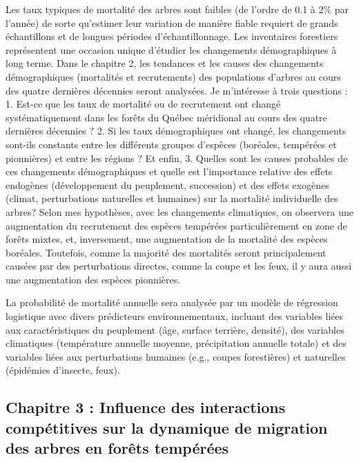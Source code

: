 \documentclass[
]{article}
\begin{document}
Les taux typiques de mortalité des arbres sont faibles (de l'ordre de
0.1 à 2\% par l'année) de sorte qu'estimer leur variation de manière
fiable requiert de grands échantillons et de longues périodes
d'échantillonnage. Les inventaires forestiers représentent une occasion
unique d'étudier les changements démographiques à long terme. Dans le
chapitre 2, les tendances et les causes des changements démographiques
(mortalités et recrutements) des populations d'arbres au cours des
quatre dernières décennies seront analysées. Je m'intéresse à trois
questions : 1. Est-ce que les taux de mortalité ou de recrutement ont
changé systématiquement dans les forêts du Québec méridional au cours
des quatre dernières décennies ? 2. Si les taux démographiques ont
changé, les changements sont-ils constants entre les différents groupes
d'espèces (boréales, tempérées et pionnières) et entre les régions ? Et
enfin, 3. Quelles sont les causes probables de ces changements
démographiques et quelle est l'importance relative des effets endogènes
(développement du peuplement, succession) et des effets exogènes
(climat, perturbations naturelles et humaines) sur la mortalité
individuelle des arbres? Selon mes hypothèses, avec les changements
climatiques, on observera une augmentation du recrutement des espèces
tempérées particulièrement en zone de forêts mixtes, et, inversement,
une augmentation de la mortalité des espèces boréales. Toutefois, comme
la majorité des mortalités seront principalement causées par des
perturbations directes, comme la coupe et les feux, il y aura aussi une
augmentation des espèces pionnières.

La probabilité de mortalité annuelle sera analysée par un modèle de
régression logistique avec divers prédicteurs environnementaux, incluant
des variables liées aux caractéristiques du peuplement (âge, surface
terrière, densité), des variables climatiques (température annuelle
moyenne, précipitation annuelle totale) et des variables liées aux
perturbations humaines (e.g., coupes forestières) et naturelles
(épidémies d'insecte, feux).

\hypertarget{chapitre-3-influence-des-interactions-compuxe9titives-sur-la-dynamique-de-migration-des-arbres-en-foruxeats-tempuxe9ruxe9es}{%
\subsection{Chapitre 3 : Influence des interactions compétitives sur la
dynamique de migration des arbres en forêts
tempérées}\label{chapitre-3-influence-des-interactions-compuxe9titives-sur-la-dynamique-de-migration-des-arbres-en-foruxeats-tempuxe9ruxe9es}}
\end{document}

